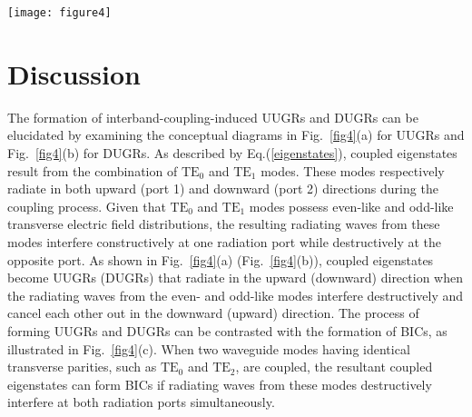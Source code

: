 \documentclass[%
 reprint,
superscriptaddress,
 amsmath,amssymb, aps,
]{revtex4-1}
\begin{document}
\begin{figure*}[]
\centering\texttt{[image: figure4]}
\caption {\label{fig4} Conceptual illustrations depicting the formation mechanisms of (a) UUGRs, (b) DUGRs, and (c) BICs. UUGRs and DUGRs arise when radiating waves emitted from the even-like $\mathrm{TE}_{0}$ mode and odd-like $\mathrm{TE}_{1}$ mode undergo destructive interference in the downward and upward directions, respectively. Conversely, a coupled eigenstate manifests as a BIC with an infinite $Q$ factor when radiating waves from modes with identical transverse parities destructively interfere in both upward and downward directions simultaneously.}
\end{figure*}

\section{Discussion}
The formation of interband-coupling-induced UUGRs and DUGRs can be elucidated by examining the conceptual diagrams in Fig.~\ref{fig4}(a) for UUGRs and Fig.~\ref{fig4}(b) for DUGRs. As described by Eq.(\ref{eigenstates}), coupled eigenstates result from the combination of $\mathrm{TE}_0$ and $\mathrm{TE}_1$ modes. These modes respectively radiate in both upward (port 1) and downward (port 2) directions during the coupling process. Given that $\mathrm{TE}_0$ and $\mathrm{TE}_1$ modes possess even-like and odd-like transverse electric field distributions, the resulting radiating waves from these modes interfere constructively at one radiation port while destructively at the opposite port. As shown in Fig.~\ref{fig4}(a) (Fig.~\ref{fig4}(b)), coupled eigenstates become UUGRs (DUGRs) that radiate in the upward (downward) direction when the radiating waves from the even- and odd-like modes interfere destructively and cancel each other out in the downward (upward) direction. The process of forming UUGRs and DUGRs can be contrasted with the formation of BICs, as illustrated in Fig.~\ref{fig4}(c). When two waveguide modes having identical transverse parities, such as $\mathrm{TE}_0$ and $\mathrm{TE}_2$, are coupled, the resultant coupled eigenstates can form BICs if radiating waves from these modes destructively interfere at both radiation ports simultaneously.
\end{document}
